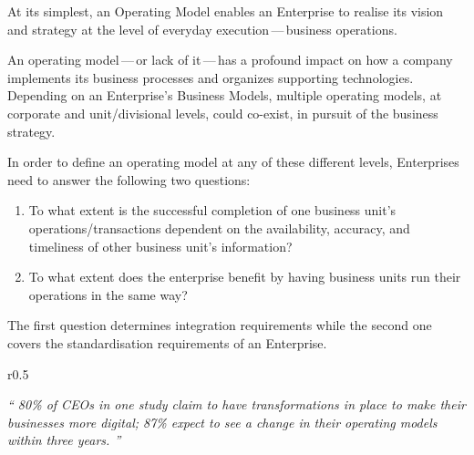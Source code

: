 %
%

At its simplest, an Operating Model enables an Enterprise to realise its vision and strategy
at the level of everyday execution\,---\,business operations.

An operating model\,---\,or lack of it\,---\,has a profound impact on how a company implements its
business processes and organizes supporting technologies.
Depending on an Enterprise's Business Models, multiple operating models,
at corporate and unit/divisional levels, could co-exist, in pursuit of the business strategy.

In order to define an operating model at any of these different levels,
Enterprises need to answer the following two questions:

\begin{enumerate}
    \item To what extent is the successful completion of one business unit’s operations/transactions dependent on the
    availability, accuracy, and timeliness of other business unit’s information?
    \item To what extent does the enterprise benefit by having business units run their operations in the same way?
\end{enumerate}

The first question determines integration requirements while the second one covers the standardisation requirements
of an Enterprise.

\begin{wrapfigure}[8]{r}{0.5\textwidth}
    \vspace{-12pt}
    \begin{center}
        \begin{tcolorbox}[colback=secondary!5,colframe=secondary!60,left=2pt,right=2pt]
            \itshape\large\enquote{%
                80\% of CEOs in one study claim to have transformations in place to make their businesses more digital;
                87\% expect to see a change in their operating models within three years.%
            }%
            \begin{flushright}\textcite{align_operating_model_to_strategy}\end{flushright}%
        \end{tcolorbox}
    \end{center}
\end{wrapfigure}


